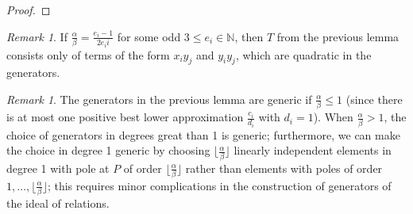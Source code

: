\documentclass{amsart}
\theoremstyle{plain}
\theoremstyle{definition}
\theoremstyle{remark}
\newtheorem{rem}[thm]{Remark}
\numberwithin{equation}{section}
\begin{document}
\begin{proof}
%



\end{proof}

\begin{rem}\label{rem:quad-gen}
If $\frac{\alpha}{\beta}=\frac{e_i-1}{2 e_ii}$ for some odd $3\le e_i\in \mathbb{N}$, then $T$ from the previous lemma consists only of terms of the form $x_i y_j$ and $y_i y_j$, which are quadratic in the generators.
\end{rem}


\begin{rem}\label{rem:sat-1-gen-lem-generic}
The generators in the previous lemma are generic if $\frac{\alpha}{\beta}\le 1$ (since there is at most one positive best lower approximation $\frac{c_i}{d_i}$ with $d_i=1$).  When $\frac{\alpha}{\beta}>1$, the choice of generators in degrees great than 1 is generic; furthermore, we can make the choice in degree 1 generic by choosing $\lfloor \frac{\alpha}{\beta}\rfloor$ linearly independent elements in degree 1 with pole at $P$ of order $\lfloor \frac{\alpha}{\beta}\rfloor$ rather than elements with poles of order $1, \ldots, \lfloor \frac{\alpha}{\beta}\rfloor$; this requires minor complications in the construction of generators of the ideal of relations.
\end{rem}
\end{document}
